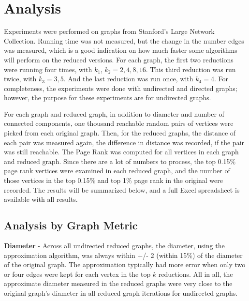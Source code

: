 \documentclass[11pt]{article}
\begin{document}
\section{Analysis}
Experiments were performed on graphs from Stanford's Large Network Collection.  Running time was not measured, but the change in the number edges was measured, which is a good indication on how much faster some algorithms will perform on the reduced versions.  For each graph, the first two reductions were running four times, with $k_1$, $k_2 = 2,4,8,16$.  This third reduction was run twice, with $k_3 = 3,5$.  And the last reduction was run once, with $k_4 = 4$.  For completeness, the experiments were done with undirected and directed graphs; however, the purpose for these experiments are for undirected graphs. 

For each graph and reduced graph, in addition to diameter and number of connected components, one thousand reachable random pairs of vertices were picked from each original graph.  Then, for the reduced graphs, the distance of each pair was measured again, the difference in distance was recorded, if the pair was still reachable.  The Page Rank was computed for all vertices in each graph and reduced graph.  Since there are a lot of numbers to process, the top 0.15\% page rank vertices were examined in each reduced graph, and the number of those vertices in the top 0.15\% and top 1\% page rank in the original were recorded.  The results will be summarized below, and a full Excel spreadsheet is available with all results.

\subsection{Analysis by Graph Metric}
\textbf{Diameter} - Across all undirected reduced graphs, the diameter, using the approximation algorithm, was always within +/- 2 (within 15\%) of the diameter of the original graph.  The approximation typically had more error when only two or four edges were kept for each vertex in the top $k$ reductions. All in all, the approximate diameter measured in the reduced graphs were very close to the original graph's diameter in all reduced graph iterations for undirected graphs.
\end{document}
